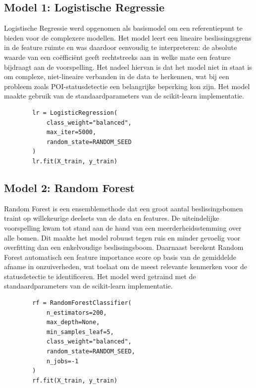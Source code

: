 \subsection{Model 1: Logistische Regressie}
Logistische Regressie werd opgenomen als basismodel om een referentiepunt te bieden voor de complexere modellen. Het model leert een lineaire beslissingsgrens in de feature ruimte en was daardoor eenvoudig te interpreteren: 
de absolute waarde van een coëfficiënt geeft rechtstreeks aan in welke mate een feature bijdraagt aan de voorspelling. Het nadeel hiervan is dat het model niet in staat is om complexe, niet-lineaire verbanden in de data te herkennen, wat bij een probleem zoals POI-statusdetectie een belangrijke beperking kon zijn. Het model maakte gebruik van de standaardparameters van de scikit-learn implementatie.

\begin{listing}[H]
    \begin{verbatim}
        lr = LogisticRegression(
            class_weight="balanced",
            max_iter=5000,
            random_state=RANDOM_SEED
        )
        lr.fit(X_train, y_train)
    \end{verbatim}
    \caption[Training Logistische Regressie]{Initialisatie en training van het Logistische Regressie model.}
\end{listing}

\subsection{Model 2: Random Forest}
Random Forest is een ensemblemethode dat een groot aantal beslissingsbomen traint op willekeurige deelsets van de data en features. De uiteindelijke voorspelling kwam tot stand aan de hand van een meerderheidsstemming over alle bomen. Dit maakte het model robuust tegen ruis en minder gevoelig voor overfitting dan een enkelvoudige beslissingsboom. Daarnaast berekent Random Forest automatisch een feature importance score op basis van de gemiddelde afname in onzuiverheden, wat toelaat om de meest relevante kenmerken voor de statusdetectie te identificeren. Het model werd getraind met de standaardparameters van de scikit-learn implementatie.

\begin{listing}[H]
    \begin{verbatim}
        rf = RandomForestClassifier(
            n_estimators=200,
            max_depth=None,
            min_samples_leaf=5,
            class_weight="balanced",
            random_state=RANDOM_SEED,
            n_jobs=-1
        )
        rf.fit(X_train, y_train)
    \end{verbatim}
    \caption[Training Random Forest]{Initialisatie en training van het Random Forest model.}
\end{listing}

